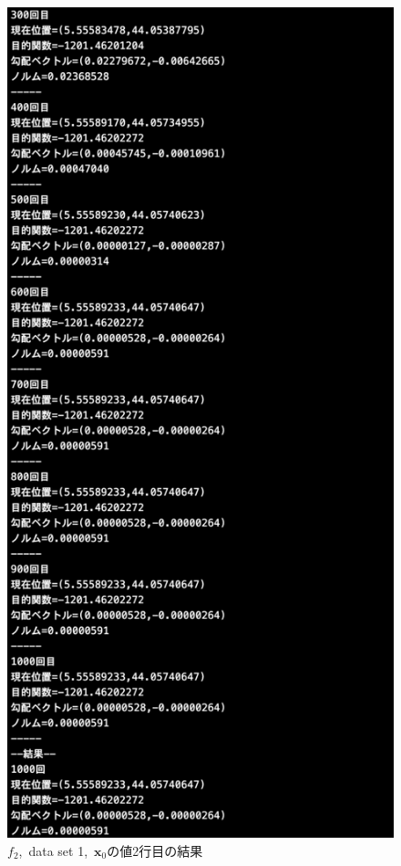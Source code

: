 \documentclass[12pt]{jarticle}
\begin{document}
\begin{figure}[h]
\begin{minipage}{0.5\hsize}
    \end{minipage}
    \begin{minipage}{0.5\hsize}
        \begin{center}
            \includegraphics[scale=0.2]{kadai1_2s_out1_2_3.png}
        \end{center}
    \end{minipage}
    \caption{$f_2$,\ data set 1,\ $\boldsymbol{x}_0$の値2行目の結果}
\end{figure}
\end{document}

